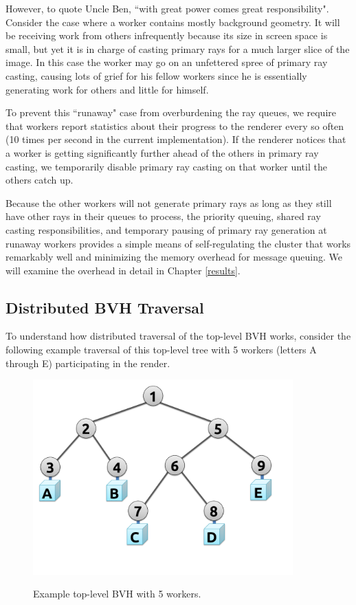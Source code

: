 \documentclass[12pt]{ucthesis}
\newcommand{\captionfonts}{\small\bf\ssp}
\begin{document}
However, to quote Uncle Ben, ``with great power comes great
responsibility". Consider the case where a worker contains mostly background
geometry. It will be receiving work from others infrequently because its size
in screen space is small, but yet it is in charge of casting primary rays for
a much larger slice of the image. In this case the worker may go on an
unfettered spree of primary ray casting, causing lots of grief for his fellow
workers since he is essentially generating work for others and little for
himself.

To prevent this ``runaway" case from overburdening the ray queues, we require
that workers report statistics about their progress to the renderer every so
often (10 times per second in the current implementation). If the renderer
notices that a worker is getting significantly further ahead of the others in
primary ray casting, we temporarily disable primary ray casting on that worker
until the others catch up.

Because the other workers will not generate primary rays as long as they still
have other rays in their queues to process, the priority queuing, shared
ray casting responsibilities, and temporary pausing of primary ray generation at
runaway workers provides a simple means of self-regulating the cluster that
works remarkably well and minimizing the memory overhead for message queuing.
We will examine the overhead in detail in Chapter \ref{results}.

\subsection{Distributed BVH Traversal}
\label{traversal}

To understand how distributed traversal of the top-level BVH works, consider
the following example traversal of this top-level tree with 5 workers (letters
A through E) participating in the render.

\begin{figure}[H]
    \centering
    \includegraphics[width=100mm]{figures/traversal1.pdf}
    \captionfonts
    \caption{Example top-level BVH with 5 workers.}
    \label{fig:traversal1}
\end{figure}
\end{document}
